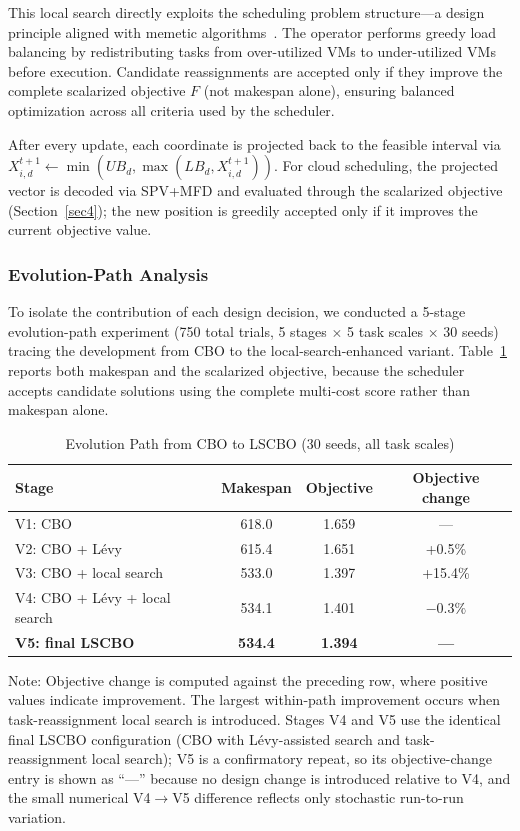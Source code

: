 \documentclass[pdflatex,onecolumn,sn-mathphys-num]{sn-jnl}
\begin{document}
This local search directly exploits the scheduling problem structure---a design principle aligned with memetic algorithms~\cite{Moscato1989}. The operator performs greedy load balancing by redistributing tasks from over-utilized VMs to under-utilized VMs before execution. Candidate reassignments are accepted only if they improve the complete scalarized objective $F$ (not makespan alone), ensuring balanced optimization across all criteria used by the scheduler.

After every update, each coordinate is projected back to the feasible interval via $X_{i,d}^{t+1} \leftarrow \min(UB_d, \max(LB_d, X_{i,d}^{t+1}))$. For cloud scheduling, the projected vector is decoded via SPV+MFD and evaluated through the scalarized objective (Section~\ref{sec4}); the new position is greedily accepted only if it improves the current objective value.

\subsubsection{Evolution-Path Analysis}\label{sec:evolution}
To isolate the contribution of each design decision, we conducted a 5-stage evolution-path experiment (750 total trials, 5 stages $\times$ 5 task scales $\times$ 30 seeds) tracing the development from CBO to the local-search-enhanced variant. Table~\ref{tab:evolution} reports both makespan and the scalarized objective, because the scheduler accepts candidate solutions using the complete multi-cost score rather than makespan alone.

\begin{table}[ht]
\centering
\caption{Evolution Path from CBO to LSCBO (30 seeds, all task scales)}\label{tab:evolution}
\begin{tabular}{l c c c}
\toprule
\textbf{Stage} & \textbf{Makespan} & \textbf{Objective} & \textbf{Objective change} \\
\midrule
V1: CBO & 618.0 & 1.659 & --- \\
V2: CBO + L\'{e}vy & 615.4 & 1.651 & +0.5\% \\
V3: CBO + local search & 533.0 & 1.397 & +15.4\% \\
V4: CBO + L\'{e}vy + local search & 534.1 & 1.401 & $-0.3\%$ \\
\textbf{V5: final LSCBO} & \textbf{534.4} & \textbf{1.394} & \textbf{---} \\
\bottomrule
\end{tabular}
\smallskip

\footnotesize{Note: Objective change is computed against the preceding row, where positive values indicate improvement. The largest within-path improvement occurs when task-reassignment local search is introduced. Stages V4 and V5 use the identical final LSCBO configuration (CBO with L\'{e}vy-assisted search and task-reassignment local search); V5 is a confirmatory repeat, so its objective-change entry is shown as ``---'' because no design change is introduced relative to V4, and the small numerical V4$\rightarrow$V5 difference reflects only stochastic run-to-run variation.}
\end{table}
\end{document}
